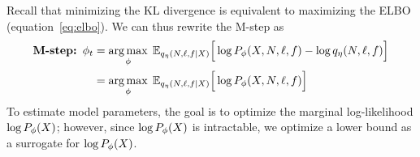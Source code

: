 Recall that minimizing the KL divergence is equivalent to maximizing the ELBO (equation~\eqref{eq:elbo}). We can thus rewrite the M-step as 
\begin{align}
    \text{{\bf M-step: }} \phi_{t} &= \operatorname*{arg\,max}_{\phi} \; \mathbb{E}_{q_{\eta}(N, \ell, f | X)}\Big[\log P_\phi(X, N, \ell, f) - \log q_\eta(N, \ell, f)\Big] \\
    &= \operatorname*{arg\,max}_{\phi} \; \mathbb{E}_{q_{\eta}(N, \ell, f | X)}\Big[\log P_\phi(X, N, \ell, f)\Big]    \label{eq:m_step}
\end{align} 
To estimate model parameters, the goal is to optimize the marginal log-likelihood $\log P_\phi(X)$; however, since $\log P_\phi(X)$ is intractable, we optimize a lower bound as a surrogate for $\log P_\phi(X)$. 

%
%
